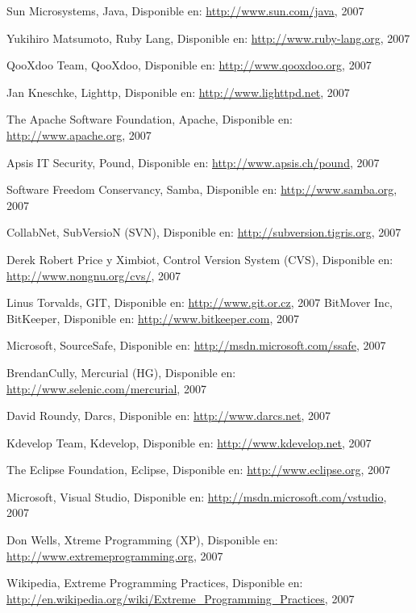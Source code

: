 \begin{thebibliography}{99}
 Sun Microsystems, Java, Disponible en:
	\url{http://www.sun.com/java}, 2007

 Yukihiro Matsumoto, Ruby Lang, Disponible en:
	\url{http://www.ruby-lang.org}, 2007

 QooXdoo Team, QooXdoo, Disponible en:	
	\url{http://www.qooxdoo.org}, 2007

 Jan Kneschke, Lighttp, Disponible en:
	\url{http://www.lighttpd.net}, 2007
	
 The Apache Software Foundation, Apache, Disponible en:
	\url{http://www.apache.org}, 2007

 Apsis IT Security, Pound, Disponible en:
	\url{http://www.apsis.ch/pound}, 2007

 Software Freedom Conservancy, Samba, Disponible en:
	\url{http://www.samba.org}, 2007

 CollabNet, SubVersioN (SVN), Disponible en:
	\url{http://subversion.tigris.org}, 2007

 Derek Robert Price y Ximbiot, Control Version System (CVS), Disponible en:
	\url{http://www.nongnu.org/cvs/}, 2007

 Linus Torvalds, GIT, Disponible en:
	\url{http://www.git.or.cz}, 2007
 BitMover Inc, BitKeeper, Disponible en:
	\url{http://www.bitkeeper.com}, 2007

 Microsoft, SourceSafe, Disponible en:
	\url{http://msdn.microsoft.com/ssafe}, 2007

 BrendanCully, Mercurial (HG), Disponible en:
	\url{http://www.selenic.com/mercurial}, 2007

 David Roundy, Darcs, Disponible en:
	\url{http://www.darcs.net}, 2007

 Kdevelop Team, Kdevelop, Disponible en:
	\url{http://www.kdevelop.net}, 2007

 The Eclipse Foundation, Eclipse, Disponible en:
	\url{http://www.eclipse.org}, 2007

 Microsoft, Visual Studio, Disponible en:
	\url{http://msdn.microsoft.com/vstudio}, 2007

 Don Wells, Xtreme Programming (XP), Disponible en:
	\url{http://www.extremeprogramming.org}, 2007

 Wikipedia, Extreme Programming Practices, Disponible en:
	\url{http://en.wikipedia.org/wiki/Extreme_Programming_Practices}, 2007


\end{thebibliography}
